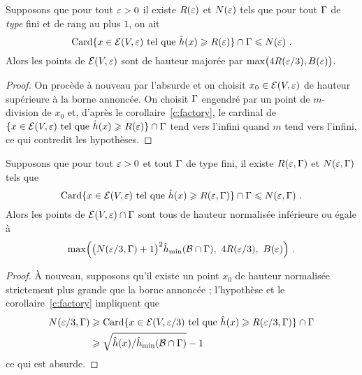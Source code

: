 \begin{coro}
  Supposons que pour tout \( \varepsilon > 0 \) il existe \( R(\varepsilon) \) et \( N(\varepsilon)
  \) tels que pour tout \( \Gamma \) de \emph{type} fini et de rang au plus \( 1
  \), on ait
  \begin{equation}
    \operatorname{Card}
    \lbrace
      x \in \mathcal E(V, \varepsilon)
      \text{ tel que }
      \hat h (x) \geqslant R(\varepsilon)
    \rbrace
    \cap \Gamma
    \leqslant
    N(\varepsilon)
    \text{ .}
  \end{equation}
  Alors les points de \( \mathcal E(V, \varepsilon) \) sont de hauteur majorée par
  \( \max \bigl( 4 R(\varepsilon/3), B(\varepsilon) \bigr) \).
\end{coro}

\begin{proof}
  On procède à nouveau par l'absurde et on choisit \( x_0 \in \mathcal E(V, \varepsilon)
  \) de hauteur supérieure à la borne annoncée. On choisit \( \Gamma \) engendré
  par un point de \( m \)-division de \( x_0 \) et, d'après le
  corollaire~\vref{c:factory}, le cardinal de
  \(
    \lbrace
      x \in \mathcal E(V, \varepsilon)
      \text{ tel que }
      \hat h (x) \geqslant R(\varepsilon)
    \rbrace
    \cap \Gamma
  \)
  tend vers l'infini quand \( m \) tend vers l'infini, ce qui contredit les
  hypothèses.
\end{proof}

\begin{coro}
  Supposons que pour tout \( \varepsilon > 0 \) et tout \( \Gamma \) de type
  fini, il existe \( R(\varepsilon, \Gamma) \) et \( N(\varepsilon, \Gamma) \) tels que
  \begin{equation}
    \operatorname{Card}
    \lbrace
      x \in \mathcal E(V, \varepsilon)
      \text{ tel que }
      \hat h (x) \geqslant R(\varepsilon, \Gamma)
    \rbrace
    \cap \Gamma
    \leqslant
    N(\varepsilon, \Gamma)
    \text{ .}
  \end{equation}
  Alors les points de \( \mathcal E(V, \varepsilon) \cap \Gamma \) sont tous de hauteur
  normalisée inférieure ou égale à
  \begin{equation}
    \max \Bigl(
      \bigl( N(\varepsilon/3, \Gamma) + 1 \bigr)^2 \hat h_{\mathrm{min}}(\mathcal B \cap \Gamma),\
      4 R(\varepsilon/3),\
      B(\varepsilon)
    \Bigr)
    \text{ .}
  \end{equation}
\end{coro}

\begin{proof}
  À nouveau, supposons qu'il existe un point \( x_0 \) de hauteur normalisée
  strictement plus grande que la borne annoncée ; l'hypothèse et le
  corollaire~\vref{c:factory} impliquent que
  \begin{align}
    N(\varepsilon/3, \Gamma)
    & \geqslant
    \operatorname{Card}
    \lbrace
      x \in \mathcal E(V, \varepsilon/3)
      \text{ tel que }
      \hat h (x) \geqslant R(\varepsilon/3, \Gamma)
    \rbrace
    \cap \Gamma
    \\ & \geqslant
    \sqrt{ \hat h (x) / \hat h_{\mathrm{min}}(\mathcal B \cap \Gamma) } - 1
  \end{align}
  ce qui est absurde.
\end{proof}



